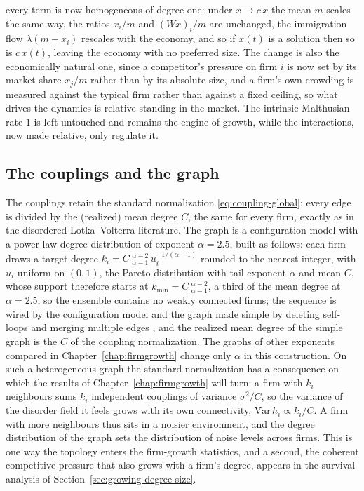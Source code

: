 every term is now homogeneous of degree one: under $x \to c\,x$ the mean $m$ scales the same
way, the ratios $x_i/m$ and $(Wx)_i/m$ are unchanged, the immigration flow $\lambda(m - x_i)$
rescales with the economy, and so if $x(t)$ is a solution then so is $c\,x(t)$, leaving the
economy with no preferred size. The change
is also the economically natural one, since a competitor's pressure on firm $i$ is now set by its
market share $x_j/m$ rather than by its absolute size, and a firm's own crowding is measured
against the typical firm rather than against a fixed ceiling, so what drives the dynamics is
relative standing in the market. The intrinsic Malthusian rate $1$ is left untouched and remains
the engine of growth, while the interactions, now made relative, only regulate it.

\subsection{The couplings and the graph}
\label{sec:completing-model}

The couplings retain the standard normalization \eqref{eq:coupling-global}: every edge is divided
by the (realized) mean degree $C$, the same for every firm, exactly as in the disordered
Lotka--Volterra literature. The graph is a configuration model with a power-law degree
distribution of exponent $\alpha = 2.5$, built as follows: each firm draws a target degree
$k_i = C\,\frac{\alpha-2}{\alpha-1}\,u_i^{-1/(\alpha-1)}$ rounded to the nearest integer, with
$u_i$ uniform on $(0,1)$, the Pareto distribution with tail exponent $\alpha$ and mean $C$,
whose support therefore starts at $k_{\min} = C\,\frac{\alpha-2}{\alpha-1}$, a third of the mean
degree at $\alpha = 2.5$, so the ensemble contains no weakly connected firms; the sequence is
wired by the configuration model and the graph made simple by deleting self-loops and merging
multiple edges \citep{catanzaro2005,britton2006}, and the realized mean degree of the simple
graph is the $C$ of the coupling normalization. The graphs of other exponents compared in
Chapter~\ref{chap:firmgrowth} change only $\alpha$ in this construction. On such a heterogeneous graph the standard normalization has a
consequence on which the results of Chapter~\ref{chap:firmgrowth} will turn: a firm with $k_i$
neighbours sums $k_i$ independent couplings of variance $\sigma^2/C$, so the variance of the
disorder field it feels grows with its own connectivity, $\mathrm{Var}\,h_i \propto k_i/C$. A firm
with more neighbours thus sits in a noisier environment, and the degree distribution of the
graph sets the distribution of noise levels across firms. This is one way the topology
enters the firm-growth statistics, and a second, the coherent competitive pressure that
also grows with a firm's degree, appears in the survival analysis of
Section~\ref{sec:growing-degree-size}.

